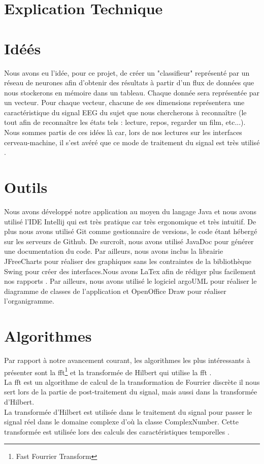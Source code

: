 
	\section{Explication Technique} %
	\label{sec:explication_technique}
		
		\section{Idéés} %
		\label{sec:idees}

		
		Nous avons eu l'idée, pour ce projet, de créer un "classifieur" représenté par un réseau de neurones afin d'obtenir des résultats à partir d'un flux de données que nous stockerons en mémoire dans un tableau. Chaque donnée sera représentée par un vecteur. Pour chaque vecteur, chacune de ses dimensions représentera une caractéristique du signal EEG du sujet que nous chercherons à reconnaître (le tout afin de reconnaître les états tels : lecture, repos, regarder un film, etc...). Nous sommes partis de ces idées là car, lors de nos lectures sur les interfaces cerveau-machine, il s'est avéré que ce mode de traitement du signal est très utilisé .
		
		\section{Outils} %
		\label{sec:outils}
		
		Nous avons développé notre application au moyen du langage Java et nous avons utilisé l'IDE Intellij qui est très pratique car très ergonomique et très intuitif. 
		De plus nous avons utilisé Git comme gestionnaire de versions, le code étant hébergé sur les serveurs de Github. De surcroît, nous avons utilisé JavaDoc pour générer une documentation du code.
		Par ailleurs, nous avons inclus la librairie JFreeCharts pour réaliser des graphiques sans les contraintes de la bibliothèque Swing pour créer des interfaces.Nous avons LaTex afin de rédiger plus facilement nos rapports .
		Par ailleurs, nous avons utilisé le logiciel argoUML pour réaliser le diagramme de classes de l'application et OpenOffice Draw pour réaliser l'organigramme.
		
		\section{Algorithmes} %
		\label{sec:algorithmes}
		 Par rapport à notre avancement courant, les algorithmes les plus intéressants à présenter sont la fft\footnote{Fast Fourrier Transform} et la transformée de Hilbert qui utilise la fft . \\ 
		 La fft est un algorithme de calcul de la transformation de Fourrier discrète il nous sert lors de la partie de post-traitement du signal, mais aussi dans la transformée d'Hilbert.\\
		 La transformée d'Hilbert est utilisée dans le traitement du signal pour passer le signal réel dans le domaine complexe d’où la classe ComplexNumber. Cette transformée est utilisée lors des calculs des caractéristiques temporelles .


